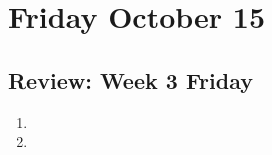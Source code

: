 \section*{Friday October 15}

\newpage


\newpage
\subsection*{Review: Week 3 Friday}
\begin{enumerate}
    \item 
    \item 
\end{enumerate}

